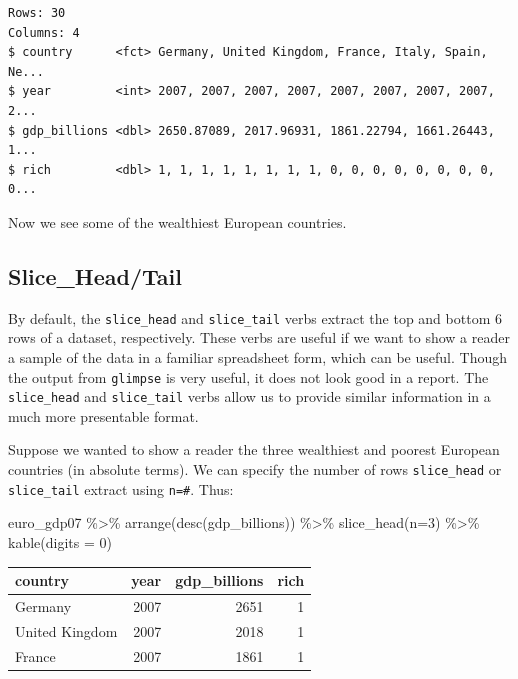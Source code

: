 \documentclass[
]{book}
\makeatletter
\newenvironment{Shaded}{\begin{snugshade}}{\end{snugshade}}
\newcommand{\AttributeTok}[1]{\textcolor[rgb]{0.61,0.61,0.61}{#1}}
\newcommand{\DecValTok}[1]{\textcolor[rgb]{0.06,0.06,0.06}{#1}}
\newcommand{\FunctionTok}[1]{\textcolor[rgb]{0,0,0}{#1}}
\newcommand{\NormalTok}[1]{#1}
\newcommand{\SpecialCharTok}[1]{\textcolor[rgb]{0,0,0}{#1}}
\newenvironment{kframe}{%
\medskip{}
\setlength{\fboxsep}{.8em}
 \def\at@end@of@kframe{}%
 \ifinner\ifhmode%
  \def\at@end@of@kframe{\end{minipage}}%
  \begin{minipage}{\columnwidth}%
 \fi\fi%
 \def\FrameCommand##1{\hskip\@totalleftmargin \hskip-\fboxsep
 \colorbox{shadecolor}{##1}\hskip-\fboxsep
     \hskip-\linewidth \hskip-\@totalleftmargin \hskip\columnwidth}%
 \MakeFramed {\advance\hsize-\width
   \@totalleftmargin\z@ \linewidth\hsize
   \@setminipage}}%
 {\par\unskip\endMakeFramed%
 \at@end@of@kframe}
\renewenvironment{Shaded}{\begin{kframe}}{\end{kframe}}
\makeatother
\begin{document}
\begin{verbatim}
Rows: 30
Columns: 4
$ country      <fct> Germany, United Kingdom, France, Italy, Spain, Ne...
$ year         <int> 2007, 2007, 2007, 2007, 2007, 2007, 2007, 2007, 2...
$ gdp_billions <dbl> 2650.87089, 2017.96931, 1861.22794, 1661.26443, 1...
$ rich         <dbl> 1, 1, 1, 1, 1, 1, 1, 1, 0, 0, 0, 0, 0, 0, 0, 0, 0...
\end{verbatim}

Now we see some of the wealthiest European countries.

\hypertarget{slice_headtail}{%
\subsection{Slice\_Head/Tail}\label{slice_headtail}}

By default, the \texttt{slice\_head} and \texttt{slice\_tail} verbs extract the top and bottom 6 rows of a dataset, respectively. These verbs are useful if we want to show a reader a sample of the data in a familiar spreadsheet form, which can be useful. Though the output from \texttt{glimpse} is very useful, it does not look good in a report. The \texttt{slice\_head} and \texttt{slice\_tail} verbs allow us to provide similar information in a much more presentable format.

Suppose we wanted to show a reader the three wealthiest and poorest European countries (in absolute terms). We can specify the number of rows \texttt{slice\_head} or \texttt{slice\_tail} extract using \texttt{n=\#}. Thus:

\begin{Shaded}
\begin{Highlighting}[]
\NormalTok{euro\_gdp07 }\SpecialCharTok{\%\textgreater{}\%} 
  \FunctionTok{arrange}\NormalTok{(}\FunctionTok{desc}\NormalTok{(gdp\_billions)) }\SpecialCharTok{\%\textgreater{}\%} 
  \FunctionTok{slice\_head}\NormalTok{(}\AttributeTok{n=}\DecValTok{3}\NormalTok{) }\SpecialCharTok{\%\textgreater{}\%} 
  \FunctionTok{kable}\NormalTok{(}\AttributeTok{digits =} \DecValTok{0}\NormalTok{)}
\end{Highlighting}
\end{Shaded}

\begin{tabular}{l|r|r|r}
\hline
country & year & gdp\_billions & rich\\
\hline
Germany & 2007 & 2651 & 1\\
\hline
United Kingdom & 2007 & 2018 & 1\\
\hline
France & 2007 & 1861 & 1\\
\hline
\end{tabular}
\end{document}
